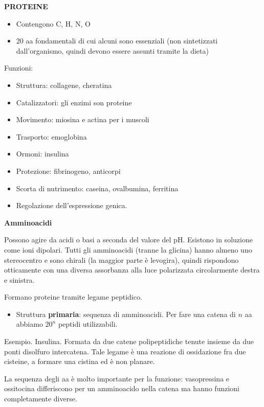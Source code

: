 \textbf{PROTEINE}

\begin{itemize}
\item
  Contengono C, H, N, O
\item
  20 aa fondamentali di cui alcuni sono essenziali (non sintetizzati
  dall'organismo, quindi devono essere assunti tramite la dieta)
\end{itemize}

Funzioni:

\begin{itemize}
\item
  Struttura: collagene, cheratina
\item
  Catalizzatori: gli enzimi son proteine
\item
  Movimento: miosina e actina per i muscoli
\item
  Trasporto: emoglobina
\item
  Ormoni: insulina
\item
  Protezione: fibrinogeno, anticorpi
\item
  Scorta di nutrimento: caseina, ovalbumina, ferritina
\item
  Regolazione dell'espressione genica.
\end{itemize}

\textbf{Amminoacidi}

Possono agire da acidi o basi a seconda del valore del pH. Esistono in
soluzione come ioni dipolari. Tutti gli amminoacidi (tranne la glicina)
hanno almeno uno stereocentro e sono chirali (la maggior parte è
levogira), quindi rispondono otticamente con una diversa assorbanza alla
luce polarizzata circolarmente destra e sinistra.

Formano proteine tramite legame peptidico.

\begin{itemize}
\item
  Struttura \textbf{primaria}: sequenza di amminoacidi. Per fare una
  catena di \(n\) aa abbiamo \(20^{n}\) peptidi utilizzabili.
\end{itemize}

Esempio. Insulina. Formata da due catene polipeptidiche tenute insieme
da due ponti disolfuro intercatena. Tale legame è una reazione di
ossidazione fra due cisteine, a formare una cistina ed è non planare.

La sequenza degli aa è molto importante per la funzione: vasopressina e
ossitocina differiscono per un amminoacido nella catena ma hanno
funzioni completamente diverse.

